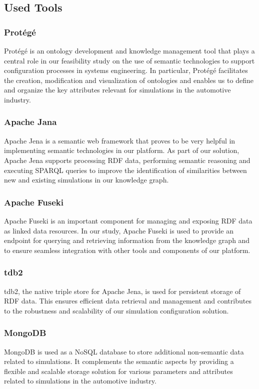 \subsection{Used Tools}
    \subsubsection{Protégé \label{subsubsec:protege}}
    Protégé is an ontology development and knowledge management tool that plays a central role in our feasibility study on the use of semantic technologies to support configuration processes in systems engineering. In particular, Protégé facilitates the creation, modification and visualization of ontologies and enables us to define and organize the key attributes relevant for simulations in the automotive industry.
    
    \subsubsection{Apache Jana}
    Apache Jena is a semantic web framework that proves to be very helpful in implementing semantic technologies in our platform. As part of our solution, Apache Jena supports processing RDF data, performing semantic reasoning and executing SPARQL queries to improve the identification of similarities between new and existing simulations in our knowledge graph.
    
    \subsubsection{Apache Fuseki}
    Apache Fuseki is an important component for managing and exposing RDF data as linked data resources. In our study, Apache Fuseki is used to provide an endpoint for querying and retrieving information from the knowledge graph and to ensure seamless integration with other tools and components of our platform.

    
    \subsubsection{\acrshort{tdb2}}
    \acrshort{tdb2}, the native triple store for Apache Jena, is used for persistent storage of RDF data. This ensures efficient data retrieval and management and contributes to the robustness and scalability of our simulation configuration solution.
    
    
    \subsubsection{MongoDB}
    MongoDB is used as a NoSQL database to store additional non-semantic data related to simulations. It complements the semantic aspects by providing a flexible and scalable storage solution for various parameters and attributes related to simulations in the automotive industry.
    
